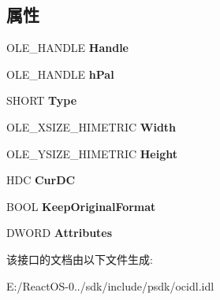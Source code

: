 \subsection*{属性}
\begin{DoxyCompactItemize}
\item 
\mbox{\label{interface_i_picture_a96052717f61bb6e19c5cc064c2a84860}} 
O\+L\+E\+\_\+\+H\+A\+N\+D\+LE {\bfseries Handle}
\item 
\mbox{\label{interface_i_picture_a3ea6c4c8b2aebef35f4dcd4b00a02731}} 
O\+L\+E\+\_\+\+H\+A\+N\+D\+LE {\bfseries h\+Pal}
\item 
\mbox{\label{interface_i_picture_aa47c40a86f6924550e7e223a22ad3e05}} 
S\+H\+O\+RT {\bfseries Type}
\item 
\mbox{\label{interface_i_picture_a8801ffa789310f3dc780c65b80b9c9f9}} 
O\+L\+E\+\_\+\+X\+S\+I\+Z\+E\+\_\+\+H\+I\+M\+E\+T\+R\+IC {\bfseries Width}
\item 
\mbox{\label{interface_i_picture_a998663d9e2065cd5cb1e473d19a32bbf}} 
O\+L\+E\+\_\+\+Y\+S\+I\+Z\+E\+\_\+\+H\+I\+M\+E\+T\+R\+IC {\bfseries Height}
\item 
\mbox{\label{interface_i_picture_a110b1e1c969c2066bd24f441fe3817c3}} 
H\+DC {\bfseries Cur\+DC}
\item 
\mbox{\label{interface_i_picture_a12c34fcfb79ad8d6a9becb6dde31a09c}} 
B\+O\+OL {\bfseries Keep\+Original\+Format}
\item 
\mbox{\label{interface_i_picture_a362e2f1da49b1d73dcdeceb3d912a7c7}} 
D\+W\+O\+RD {\bfseries Attributes}
\end{DoxyCompactItemize}


该接口的文档由以下文件生成\+:\begin{DoxyCompactItemize}
\item 
E\+:/\+React\+O\+S-\/0../sdk/include/psdk/ocidl.\+idl\end{DoxyCompactItemize}
